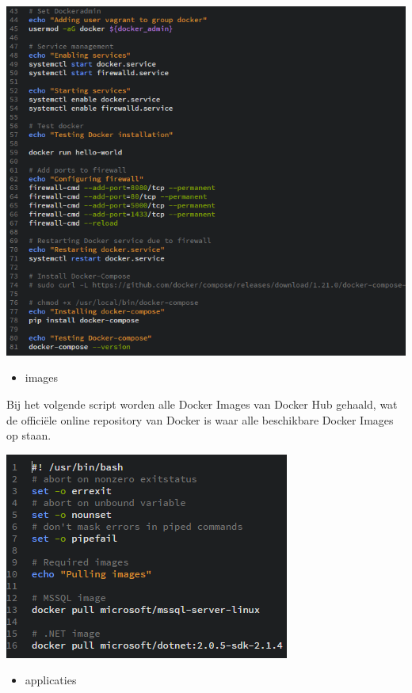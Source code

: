 \begin{center}
	\includegraphics[scale=0.6]{img/centosprereq02}
\end{center}

\begin{itemize}[noitemsep]
	\item images
\end{itemize}

Bij het volgende script worden alle Docker Images van Docker Hub gehaald, wat de officiële online repository van Docker is waar alle beschikbare Docker Images op staan.

\begin{center}
	\includegraphics[scale=0.6]{img/centosimages01}
\end{center}

\begin{itemize}[noitemsep]
	\item applicaties
\end{itemize}

